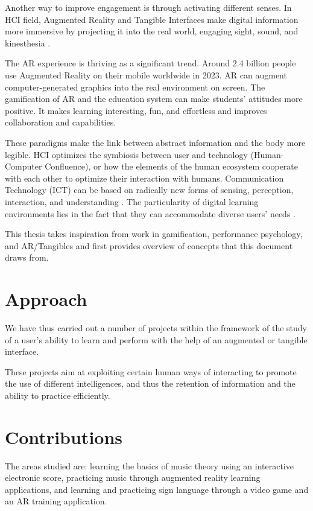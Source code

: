 Another way to improve engagement is through activating different senses. In HCI field, Augmented Reality and Tangible Interfaces make digital information more immersive by projecting it into the real world, engaging sight, sound, and kinesthesia \cite{seichter2007augmented}.

The AR experience is thriving as a significant trend. Around 2.4 billion people use Augmented Reality on their mobile worldwide in 2023. AR can augment computer-generated graphics into the real environment on screen. The gamification of AR and the education system can make students' attitudes more positive. It makes learning interesting, fun, and effortless and improves collaboration and capabilities.

These paradigms make the link between abstract information and the body more legible.
HCI optimizes the symbiosis between user and technology (Human-Computer Confluence), or how the elements of the human ecosystem cooperate with each other to optimize their interaction with humans. Communication Technology (ICT) can be based on radically new forms of sensing, perception, interaction, and understanding \cite{ferscha2007human}. The particularity of digital learning environments lies in the fact that they can accommodate diverse users’ needs \cite{stephanidis2019seven}.

This thesis takes inspiration from work in gamification, performance psychology, and AR/Tangibles and first provides overview of concepts that this document draws from.

\section{Approach}

We have thus carried out a number of projects within the framework of the study of a user's ability to learn and perform with the help of an augmented or tangible interface.

These projects aim at exploiting certain human ways of interacting to promote the use of different intelligences, and thus the retention of information and the ability to practice efficiently. 

\section{Contributions}

The areas studied are: learning the basics of music theory using an interactive electronic score, practicing music through augmented reality learning applications, and learning and practicing sign language through a video game and an AR training application.